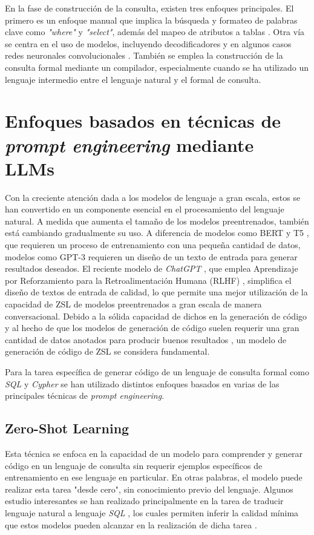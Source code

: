 En la fase de construcción de la consulta, existen tres enfoques principales. El primero es un enfoque manual que implica la búsqueda y formateo de palabras clave como \textit{"where"} y \textit{"select"}, además del mapeo de atributos a tablas \cite{neurosymquery1}. Otra vía se centra en el uso de modelos, incluyendo decodificadores y en algunos casos redes neuronales convolucionales \cite{neurosymquery2}. También se emplea la construcción de la consulta formal mediante un compilador, especialmente cuando se ha utilizado un lenguaje intermedio entre el lenguaje natural y el formal de consulta\cite{neurosymquery3}.

\section{Enfoques basados en técnicas de \textit{prompt engineering} mediante LLMs} \label{llm_approach}

Con la creciente atención dada a los modelos de lenguaje a gran escala, estos se han convertido en un componente esencial en el procesamiento del lenguaje natural. A medida que aumenta el tamaño de los modelos preentrenados, también está cambiando gradualmente su uso. A diferencia de modelos como BERT \cite{devlinetal2018} y T5 \cite{raffeletal2020}, que requieren un proceso de entrenamiento con una pequeña cantidad de datos, modelos como GPT-3 \cite{brownetal2020} requieren un diseño de un texto de entrada para generar resultados deseados. El reciente modelo de \textit{ChatGPT} \cite{chatgpt}, que emplea Aprendizaje por Reforzamiento para la Retroalimentación Humana (RLHF) \cite{christianoetal2021}, simplifica el diseño de textos de entrada de calidad, lo que permite una mejor utilización de la capacidad de ZSL de modelos preentrenados a gran escala de manera conversacional. Debido a la sólida capacidad de dichos en la generación de código \cite{llmcodegenerationsample} y al hecho de que los modelos de generación de código suelen requerir una gran cantidad de datos anotados para producir buenos resultados \cite{codegenmodeldataamount}, un modelo de generación de código de ZSL se considera fundamental.

Para la tarea específica de generar código de un lenguaje de consulta formal como \textit{SQL} y \textit{Cypher} se han utilizado distintos enfoques basados en varias de las principales técnicas de \textit{prompt engineering}.

\subsection{Zero-Shot Learning} \label{llm_approach_zsl}
	Esta técnica se enfoca en la capacidad de un modelo para comprender y generar código en un lenguaje de consulta sin requerir ejemplos específicos de entrenamiento en ese lenguaje en particular. En otras palabras, el modelo puede realizar esta tarea "desde cero", sin conocimiento previo del lenguaje. Algunos estudio interesantes se han realizado principalmente en la tarea de traducir lenguaje natural a lenguaje \textit{SQL} \cite{text2sqlzsl1} \cite{text2sqlzsl2}, los cuales permiten inferir la calidad mínima que estos modelos pueden alcanzar en la realización de dicha tarea \cite{zslislowerbound}.

